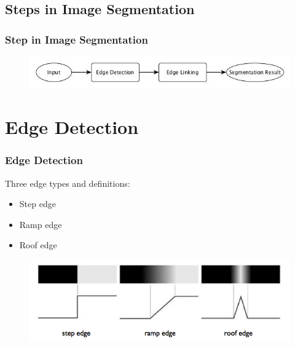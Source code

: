 \documentclass[notheorems,serif,table,compress]{beamer}  %
\begin{document}
\subsection{Steps in Image Segmentation}

\begin{frame}
\frametitle{Step in Image Segmentation}
    \begin{figure}
    \includegraphics[width=1\linewidth]{liucheng.jpg} 
    \end{figure}
\end{frame}




\section{Edge Detection}


\begin{frame}
\frametitle{Edge Detection}
Three edge types and definitions:
    \begin{itemize}
        \item Step edge
        \item Ramp edge
        \item Roof edge
    \end{itemize}
    \begin{figure}
    \includegraphics[width=0.9\linewidth]{bian.png} 
    \end{figure}
\end{frame}
\end{document}
